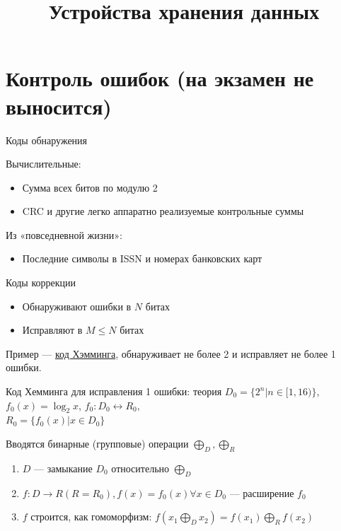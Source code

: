 \documentclass[xetex,aspectratio=43]{beamer}
\title{Устройства хранения данных}
\begin{document}
    \titleslide

    \tocslide


\section{Контроль ошибок (на экзамен не выносится)}

\begin{frame}{Коды обнаружения}

Вычислительные:

\begin{itemize}
\tightlist
\item
  Сумма всех битов по модулю 2
\item
  CRC и другие легко аппаратно реализуемые контрольные суммы
\end{itemize}

Из «повседневной жизни»:

\begin{itemize}
\tightlist
\item
  Последние символы в ISSN и номерах банковских карт
\end{itemize}
\end{frame}

\begin{frame}{Коды коррекции}

\begin{itemize}
\tightlist
\item
  Обнаруживают ошибки в \(N\) битах
\item
  Исправляют в \(M\le N\) битах
\end{itemize}

Пример --- \href{http://en.wikipedia.org/wiki/Hamming_code}{код
Хэмминга}, обнаруживает не более 2 и исправляет не более 1 ошибки.
\end{frame}

\begin{frame}{Код Хемминга для исправления 1 ошибки: теория}
\(D_0 = \{2^n | n \in [1,16)\}\),\(f_0 (x) = \log_2 x\),
\(f_0:D_0 \leftrightarrow R_0,\)\\
\(R_0 = \{f_0(x) | x \in D_0\}\)

\pause

Вводятся бинарные (групповые) операции \(\bigoplus_D, \bigoplus_R\)

\begin{enumerate}
\item
  \(D\) --- замыкание \(D_0\) относительно \(\bigoplus_D\)
\item
  \(f : D \rightarrow R (R=R_0), f(x) = f_0(x) \forall x \in D_0\) ---
  расширение \(f_0\)
\item
  \(f\) строится, как гомоморфизм:
  \(f(x_1\bigoplus_D x_2) = f(x_1)\bigoplus_R f(x_2)\)
\end{enumerate}
\end{frame}
\end{document}
